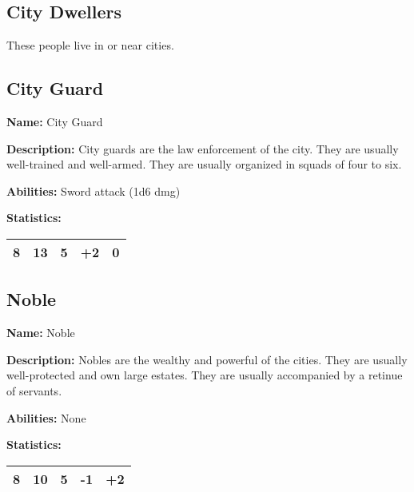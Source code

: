 \begin{multicols}{2}
\section{City Dwellers}

These people live in or near cities.

\subsection{City Guard}

\textbf{Name:} City Guard

\textbf{Description:} City guards are the law enforcement of the city. They are usually
well-trained and well-armed. They are usually organized in squads of four to six.

\textbf{Abilities:} Sword attack (1d6 dmg)

\textbf{Statistics:}

\begin{center}
{
\begin{xtabular}{|l|l|l|l|l|}
8 & 13 & 5 & +2 & 0 \\
\hline
\end{xtabular}
}
\end{center}

\subsection{Noble}

\textbf{Name:} Noble

\textbf{Description:} Nobles are the wealthy and powerful of the cities. They are usually
well-protected and own large estates. They are usually accompanied by a retinue of servants.

\textbf{Abilities:} None

\textbf{Statistics:}

\begin{center}
{
\begin{xtabular}{|l|l|l|l|l|}
8 & 10 & 5 & -1 & +2 \\
\hline
\end{xtabular}
}
\end{center}


\end{multicols}
